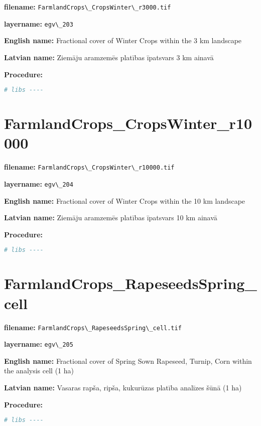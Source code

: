 \documentclass[
]{book}
\newcommand{\passthrough}[1]{#1}
\begin{document}
\textbf{filename:} \passthrough{\lstinline!FarmlandCrops\_CropsWinter\_r3000.tif!}

\textbf{layername:} \passthrough{\lstinline!egv\_203!}

\textbf{English name:} Fractional cover of Winter Crops within the 3 km landscape

\textbf{Latvian name:} Ziemāju aramzemēs platības īpatsvars 3 km ainavā

\textbf{Procedure:}

\begin{lstlisting}[language=R]
# libs ----
\end{lstlisting}

\section{FarmlandCrops\_CropsWinter\_r10000}\label{ch06.204}

\textbf{filename:} \passthrough{\lstinline!FarmlandCrops\_CropsWinter\_r10000.tif!}

\textbf{layername:} \passthrough{\lstinline!egv\_204!}

\textbf{English name:} Fractional cover of Winter Crops within the 10 km landscape

\textbf{Latvian name:} Ziemāju aramzemēs platības īpatsvars 10 km ainavā

\textbf{Procedure:}

\begin{lstlisting}[language=R]
# libs ----
\end{lstlisting}

\section{FarmlandCrops\_RapeseedsSpring\_cell}\label{ch06.205}

\textbf{filename:} \passthrough{\lstinline!FarmlandCrops\_RapeseedsSpring\_cell.tif!}

\textbf{layername:} \passthrough{\lstinline!egv\_205!}

\textbf{English name:} Fractional cover of Spring Sown Rapeseed, Turnip, Corn within the analysis cell (1 ha)

\textbf{Latvian name:} Vasaras rapša, ripša, kukurūzas platība analīzes šūnā (1 ha)

\textbf{Procedure:}

\begin{lstlisting}[language=R]
# libs ----
\end{lstlisting}
\end{document}

